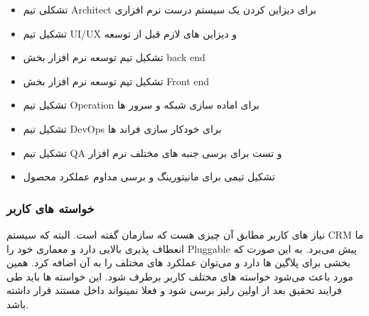 \begin{itemize}
	\item تشکلی تیم Architect برای دیزاین کردن یک سیستم درست نرم افزاری
	\item تشکیل تیم UI/UX و دیزاین های لازم قبل از توسعه
	\item تشکیل تیم توسعه نرم افزار بخش back end
	\item تشکیل تیم توسعه نرم افزار بخش Front end
	\item تشکیل تیم Operation برای اماده سازی شبکه و سرور ها
	\item تشکیل تیم DevOps برای خودکار سازی فراند ها
	\item تشکیل تیم QA و تست برای برسی جنبه های مختلف نرم افزار
	\item تشکیل تیمی برای مانیتورینگ و برسی مداوم عملکرد محصول
\end{itemize}

\subsubsection{خواسته های کاربر}

نیاز های کاربر مطابق آن چیزی هست که سازمان گفته است. البته که سیستم CRM ما انعطاف پذیری بالایی دارد و معماری خود را Pluggable پیش می‌برد.
به این صورت که بخشی برای پلاگین ها دارد و می‌توان عملکرد های مختلف را به آن اضافه کرد.
همین مورد باعث می‌شود خواسته های مختلف کاربر برطرف شود.
این خواسته ها باید طی فرایند تحقیق بعد از اولین رلیز برسی شود و فعلا نمیتواند داخل مستند قرار داشته باشد.
